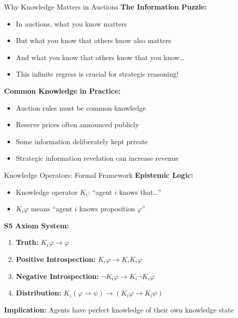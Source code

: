\documentclass[xcolor={x11names}, aspectratio=169 ]{beamer}
\begin{document}
\begin{frame}{Why Knowledge Matters in Auctions}
\textbf{The Information Puzzle:}
\begin{itemize}
  \item In auctions, what you know matters
  \item But what you know that others know also matters
  \item And what you know that others know that you know\ldots
  \item This infinite regress is crucial for strategic reasoning!
\end{itemize}

\vspace{0.3cm}
\textbf{Common Knowledge in Practice:}
\begin{itemize}
  \item Auction rules must be common knowledge
  \item Reserve prices often announced publicly
  \item Some information deliberately kept private
  \item Strategic information revelation can increase revenue
\end{itemize}
\end{frame}

\begin{frame}{Knowledge Operators: Formal Framework}
\textbf{Epistemic Logic:}
\begin{itemize}
  \item Knowledge operator $K_i$: ``agent $i$ knows that\ldots''
  \item $K_i \varphi$ means ``agent $i$ knows proposition $\varphi$''
\end{itemize}

\vspace{0.3cm}
\textbf{S5 Axiom System:}
\begin{enumerate}
  \item \textbf{Truth:} $K_i \varphi \rightarrow \varphi$
  \item \textbf{Positive Introspection:} $K_i \varphi \rightarrow K_i K_i \varphi$
  \item \textbf{Negative Introspection:} $\neg K_i \varphi \rightarrow K_i \neg K_i \varphi$
  \item \textbf{Distribution:} $K_i(\varphi \rightarrow \psi) \rightarrow (K_i \varphi \rightarrow K_i \psi)$
\end{enumerate}

\vspace{0.3cm}
\textbf{Implication:} Agents have perfect knowledge of their own knowledge state
\end{frame}
\end{document}
